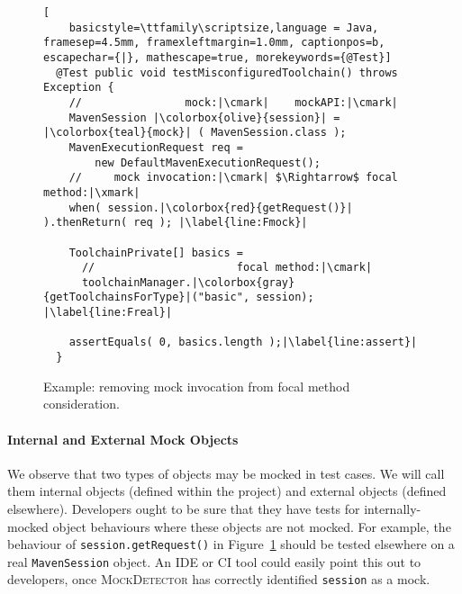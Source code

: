\begin{figure}[h]
	\begin{lstlisting}[
	basicstyle=\ttfamily\scriptsize,language = Java, framesep=4.5mm, framexleftmargin=1.0mm, captionpos=b, escapechar={|}, mathescape=true, morekeywords={@Test}]
  @Test public void testMisconfiguredToolchain() throws Exception {
    //                mock:|\cmark|    mockAPI:|\cmark|
    MavenSession |\colorbox{olive}{session}| = |\colorbox{teal}{mock}| ( MavenSession.class );
    MavenExecutionRequest req =
        new DefaultMavenExecutionRequest();
    //     mock invocation:|\cmark| $\Rightarrow$ focal method:|\xmark|
    when( session.|\colorbox{red}{getRequest()}| ).thenReturn( req ); |\label{line:Fmock}|

    ToolchainPrivate[] basics =
      //                      focal method:|\cmark|
      toolchainManager.|\colorbox{gray}{getToolchainsForType}|("basic", session); |\label{line:Freal}|

    assertEquals( 0, basics.length );|\label{line:assert}|
  }
  \end{lstlisting}

  \caption{Example: removing mock invocation from focal method consideration.}
  \label{fig:mockExampleEvaluation}
\end{figure}

\paragraph{Internal and External Mock Objects} 
We observe that two types of objects may be mocked in test cases. We will call them internal objects (defined within the project) and external objects (defined elsewhere). Developers ought to be sure that they have tests for internally-mocked object behaviours where these objects are not mocked. For example, the behaviour of \texttt{session.getRequest()} in Figure~\ref{fig:mockExampleEvaluation} should be tested elsewhere on a real \texttt{MavenSession} object. An IDE or CI tool could easily point this out to developers, once \textsc{MockDetector} has correctly identified \texttt{session} as a mock.
